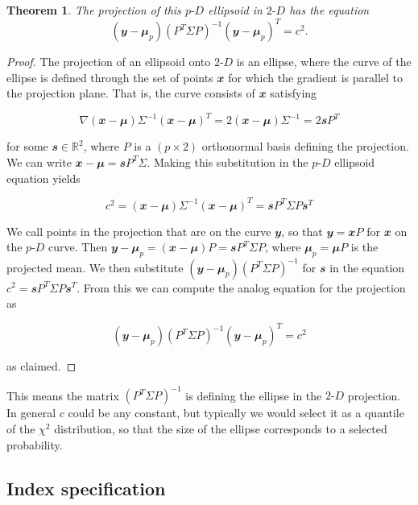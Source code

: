 \documentclass[
  12pt]{article}
\newcommand\pD{$p\text{-}D$}
\newcommand\gD{$2\text{-}D$}
\newtheorem*{theorem}{Theorem}
\begin{document}
\begin{theorem}
  The projection of this \pD{} ellipsoid in \gD{} has the equation
$$(\mathbfit{y} - \mathbfit{\mu}_p)(P^T \Sigma P)^{-1}(\mathbfit{y} - \mathbfit{\mu}_p)^T = c^2.$$
\end{theorem}
\begin{proof}
The projection of an ellipsoid onto \gD{} is an ellipse, where the curve of the ellipse is defined through the set of points $\mathbfit{x}$ for which the gradient is parallel to the projection plane. That is, the curve 
consists of $\mathbfit{x}$ satisfying

$$\nabla (\mathbfit{x}-\mathbfit{\mu}) \Sigma^{-1}(\mathbfit{x}-\mathbfit{\mu})^T = 2 (\mathbfit{x}-\mathbfit{\mu}) \Sigma^{-1} = 2\mathbfit{s}P^T
$$

for some $\mathbfit{s} \in \mathbb{R}^2$, where $P$ is a $(p\times 2)$ orthonormal basis defining the
projection. We can write $\mathbfit{x}-\mathbfit{\mu} = \mathbfit{s} P^T \Sigma$.
Making this substitution in the \pD{} ellipsoid equation yields

$$c^2 = (\mathbfit{x}-\mathbfit{\mu}) \Sigma^{-1}(\mathbfit{x}-\mathbfit{\mu})^T = \mathbfit{s} P^T \Sigma P \mathbfit{s}^T
$$

We call points in the projection that are on the curve $\mathbfit{y}$, so that $\mathbfit{y} = \mathbfit{x}P$ for $\mathbfit{x}$ on the \pD{} curve. Then $\mathbfit{y} - \mathbfit{\mu}_p = (\mathbfit{x} - \mathbfit{\mu})P = \mathbfit{s} P^T \Sigma P$, where $\mathbfit{\mu}_p = \mathbfit{\mu} P$ is the projected mean. We then substitute $(\mathbfit{y} - \mathbfit{\mu}_p) (P^T \Sigma P)^{-1}$ for $\mathbfit{s}$ in the equation \(c^2 = \mathbfit{s} P^T \Sigma P \mathbfit{s}^T\). From this we can compute the analog equation for the projection as

$$(\mathbfit{y} - \mathbfit{\mu}_p)(P^T \Sigma P)^{-1}(\mathbfit{y} - \mathbfit{\mu}_p)^T = c^2$$

as claimed.
\end{proof}

This means the matrix \((P^T \Sigma P)^{-1}\) is defining the ellipse in
the \gD{} projection. In general \(c\) could be any constant, but
typically we would select it as a quantile of the \(\chi^2\)
distribution, so that the size of the ellipse corresponds to a selected
probability.

\subsection{Index specification}\label{index-specification}
\end{document}
